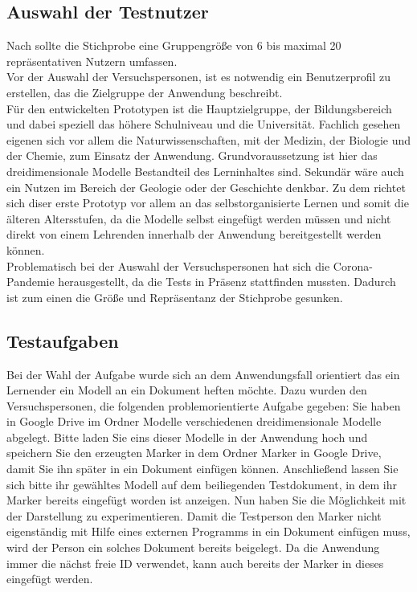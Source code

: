 \subsection{Auswahl der Testnutzer}
Nach \cite[S. 38]{hegner:evaluation} sollte die Stichprobe eine Gruppengröße von 6 bis maximal 20 repräsentativen Nutzern umfassen. \\
Vor der Auswahl der Versuchspersonen, ist es notwendig ein Benutzerprofil zu erstellen, das die Zielgruppe der Anwendung beschreibt. \\
Für den entwickelten Prototypen ist die Hauptzielgruppe, der Bildungsbereich und dabei speziell das höhere Schulniveau und die Universität. Fachlich gesehen eigenen sich vor allem die Naturwissenschaften, mit der Medizin, der Biologie und der Chemie, zum Einsatz der Anwendung. Grundvoraussetzung ist hier das dreidimensionale Modelle Bestandteil des Lerninhaltes sind. Sekundär wäre auch ein Nutzen im Bereich der Geologie oder der Geschichte denkbar. Zu dem richtet sich diser erste Prototyp vor allem an das selbstorganisierte Lernen und somit die älteren Altersstufen, da die Modelle selbst eingefügt werden müssen und nicht direkt von einem Lehrenden innerhalb der Anwendung bereitgestellt werden können. \\
Problematisch bei der Auswahl der Versuchspersonen hat sich die Corona-Pandemie herausgestellt, da die Tests in Präsenz stattfinden mussten.
Dadurch ist zum einen die Größe und Repräsentanz der Stichprobe gesunken.\\

\subsection{Testaufgaben}
Bei der Wahl der Aufgabe wurde sich an dem Anwendungsfall orientiert das ein Lernender ein Modell an ein Dokument heften möchte. Dazu wurden den Versuchspersonen, die folgenden problemorientierte Aufgabe gegeben:
\glqq Sie haben in Google Drive im Ordner Modelle verschiedenen dreidimensionale Modelle abgelegt. Bitte laden Sie eins dieser Modelle in der Anwendung hoch und speichern Sie den erzeugten Marker in dem Ordner Marker in Google Drive, damit Sie ihn später in ein Dokument einfügen können. Anschließend lassen Sie sich bitte ihr gewähltes Modell auf dem beiliegenden Testdokument, in dem ihr Marker bereits eingefügt worden ist anzeigen. Nun haben Sie die Möglichkeit mit der Darstellung zu experimentieren. \grqq
Damit die Testperson den Marker nicht eigenständig mit Hilfe eines externen Programms in ein Dokument einfügen muss, wird der Person ein solches Dokument bereits beigelegt. Da die Anwendung immer die nächst freie ID verwendet, kann auch bereits der Marker in dieses eingefügt werden.

